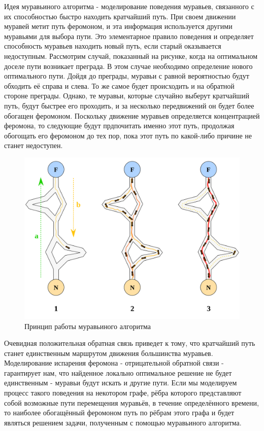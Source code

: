 \documentclass[12pt]{report}
\begin{document}
Идея муравьиного алгоритма - моделирование поведения муравьев, связанного с их способностью быстро находить кратчайший путь. При своем движении муравей метит путь феромоном, и эта информация используется другими муравьями для выбора пути. Это элементарное правило поведения и определяет способность муравьев находить новый путь, если старый оказывается недоступным. Рассмотрим случай, показанный на рисунке, когда на оптимальном доселе пути возникает преграда. В этом случае необходимо определение нового оптимального пути. Дойдя до преграды, муравьи с равной вероятностью будут обходить её справа и слева. То же самое будет происходить и на обратной стороне преграды. Однако, те муравьи, которые случайно выберут кратчайший путь, будут быстрее его проходить, и за несколько передвижений он будет более обогащен феромоном. Поскольку движение муравьев определяется концентрацией феромона, то следующие будут прдпочитать именно этот путь, продолжая обогощать его феромоном до тех пор, пока этот путь по какой-либо причине не станет недоступен. \\
	\begin{figure}[h]
        	\begin{center}
        		\includegraphics[scale=0.2]{ant_alg}
        		\caption{Принцип работы муравьиного алгоритма}
        		\label{fig:def}
        	\end{center}
        \end{figure}
        
Очевидная положительная обратная связь приведет к тому, что кратчайший путь станет единственным маршрутом движения большинства муравьев. Моделирование испарения феромона - отрицательной обратной связи - гарантирует нам, что найденное локально оптимальное решение не будет единственным - муравьи будут искать и другие пути. Если мы моделируем процесс такого поведения на некотором графе, рёбра которого представляют собой возможные пути перемещения муравьёв, в течение определённого времени, то наиболее обогащённый феромоном путь по рёбрам этого графа и будет являться решением задачи, полученным с помощью муравьиного алгоритма. 
\end{document}
